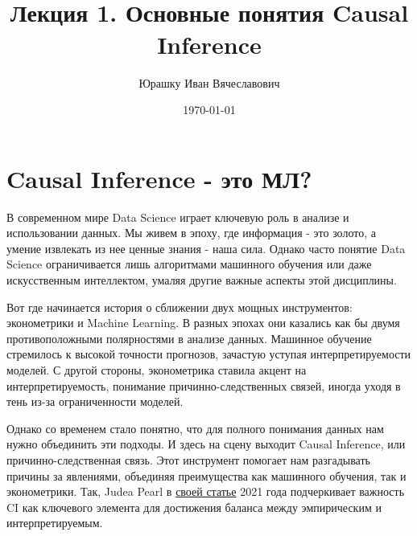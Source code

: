 \documentclass{article}
\title{
    \textbf{\coursename}\\
    Лекция 1.
    Основные понятия Causal Inference
    }
\author{Юрашку Иван Вячеславович}
\date{\today}
\begin{document}

    \maketitle

    \section*{Causal Inference - это МЛ?}

        В современном мире Data Science играет ключевую роль в анализе и использовании данных. Мы живем в эпоху, где информация - это золото, а умение извлекать из нее ценные знания - наша сила. Однако часто понятие Data Science ограничивается лишь алгоритмами машинного обучения или даже искусственным интеллектом, умаляя другие важные аспекты этой дисциплины.

        Вот где начинается история о сближении двух мощных инструментов: эконометрики и Machine Learning. В разных эпохах они казались как бы двумя противоположными полярностями в анализе данных. Машинное обучение стремилось к высокой точности прогнозов, зачастую уступая интерпретируемости моделей. С другой стороны, эконометрика ставила акцент на интерпретируемость, понимание причинно-следственных связей, иногда уходя в тень из-за ограниченности моделей.

        Однако со временем стало понятно, что для полного понимания данных нам нужно объединить эти подходы. И здесь на сцену выходит Causal Inference, или причинно-следственная связь. Этот инструмент помогает нам разгадывать причины за явлениями, объединяя преимущества как машинного обучения, так и эконометрики. Так, Judea Pearl в \href{https://www.degruyter.com/document/doi/10.1515/jci-2021-0006/html}{своей статье} 2021 года подчеркивает важность CI как ключевого элемента для достижения баланса между эмпирическим и интерпретируемым.
\end{document}

